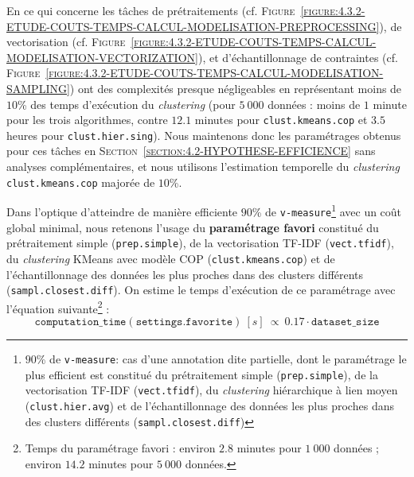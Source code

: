 			En ce qui concerne les tâches de prétraitements (cf. \textsc{Figure~\ref{figure:4.3.2-ETUDE-COUTS-TEMPS-CALCUL-MODELISATION-PREPROCESSING}}), de vectorisation (cf. \textsc{Figure~\ref{figure:4.3.2-ETUDE-COUTS-TEMPS-CALCUL-MODELISATION-VECTORIZATION}}), et d'échantillonnage de contraintes (cf. \textsc{Figure~\ref{figure:4.3.2-ETUDE-COUTS-TEMPS-CALCUL-MODELISATION-SAMPLING}}) ont des complexités presque négligeables en représentant moins de $10$\% des temps d'exécution du \textit{clustering} (pour $5~000$ données : moins de $1$ minute pour les trois algorithmes, contre $12.1$ minutes pour \texttt{clust.kmeans.cop} et $3.5$ heures pour \texttt{clust.hier.sing}).
			Nous maintenons donc les paramétrages obtenus pour ces tâches en \textsc{Section~\ref{section:4.2-HYPOTHESE-EFFICIENCE}} sans analyses complémentaires, et nous utilisons l'estimation temporelle du \textit{clustering} \texttt{clust.kmeans.cop} majorée de $10$\%.
			
			\begin{leftBarSummary}
				Dans l'optique d'atteindre de manière efficiente $90$\% de \texttt{v-measure}\footnote{
					$90$\% de \texttt{v-measure}: cas d'une annotation dite partielle, dont le paramétrage le plus efficient est constitué du prétraitement simple (\texttt{prep.simple}), de la vectorisation TF-IDF (\texttt{vect.tfidf}), du \textit{clustering} hiérarchique à lien moyen (\texttt{clust.hier.avg}) et de l'échantillonnage des données les plus proches dans des clusters différents (\texttt{sampl.closest.diff})
				}
				avec un coût global minimal, nous retenons l'usage du \textbf{paramétrage favori} constitué du prétraitement simple (\texttt{prep.simple}), de la vectorisation TF-IDF (\texttt{vect.tfidf}), du \textit{clustering} KMeans avec modèle COP (\texttt{clust.kmeans.cop}) et de l'échantillonnage des données les plus proches dans des clusters différents (\texttt{sampl.closest.diff}).
				On estime le temps d'exécution de ce paramétrage avec l'équation suivante\footnote{
					Temps du paramétrage favori : environ $2.8$ minutes pour $1~000$ données ; environ $14.2$ minutes pour $5~000$ données.
				} :
				\begin{equation}
					\label{equation:4.3.2-ETUDE-COUTS-TEMPS-CALCUL-PARAMETRAGE-FAVORI}
					\texttt{computation\_time}(\texttt{settings.favorite})~[s]~
					\propto~0.17 \cdot \texttt{dataset\_size}
				\end{equation}
			\end{leftBarSummary}
	
